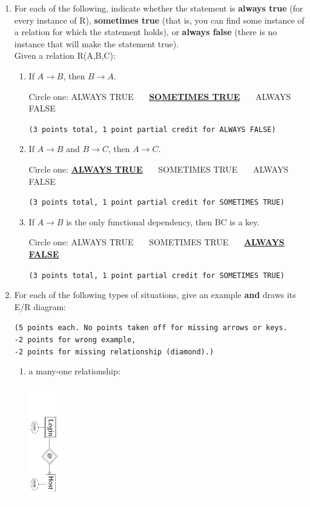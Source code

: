 \documentclass[12pt]{article}
\begin{document}
\begin{enumerate}
\begin{enumerate}
{	(5 points total.  If no explanation, only 1 point partial credit.)
	}
	
    \end{enumerate}

\item For each of the following, indicate whether the statement is {\bf always true}
(for every instance of R), {\bf sometimes true} (that
is, you can find some instance of a relation for which the statement holds), or
{\bf always false} (there is no instance that will make the statement true).\\
Given a relation R(A,B,C):
\begin{enumerate}
    \item If $A \rightarrow B$, then $B \rightarrow A$.
	    
	    Circle one:  ALWAYS TRUE \ \ \ \underline{\bf SOMETIMES TRUE} \ \ \ ALWAYS FALSE
	    
	    {\tt (3 points total, 1 point partial credit for ALWAYS FALSE)}
    \item If $A \rightarrow B$ and $B \rightarrow C$, then $A \rightarrow C$.
	    
	    Circle one:  \underline{\bf ALWAYS TRUE} \ \ \ SOMETIMES TRUE \ \ \ ALWAYS FALSE
	    
	    {\tt (3 points total, 1 point partial credit for SOMETIMES TRUE)}
    \item If $A \rightarrow B$ is the only functional dependency, then BC is a key. 
	    
	    Circle one:  ALWAYS TRUE \ \ \ SOMETIMES TRUE \ \ \ \underline{\bf ALWAYS FALSE}
	    
	    {\tt (3 points total, 1 point partial credit for SOMETIMES TRUE)}
\end{enumerate}

\item For each of the following types of situations, give an
	example {\bf and} draws its E/R diagram:
	
	{\tt (5 points each.  No points taken off for missing arrows or keys.\\
	-2 points for wrong example,\\
	-2 points for missing relationship (diamond).)
	}
	
    \begin{enumerate}
	\item a many-one relationship:
	
		\includegraphics[height=2in, angle=90]{login_weakES.pdf}
	

\end{enumerate}
\end{enumerate}
\end{document}
